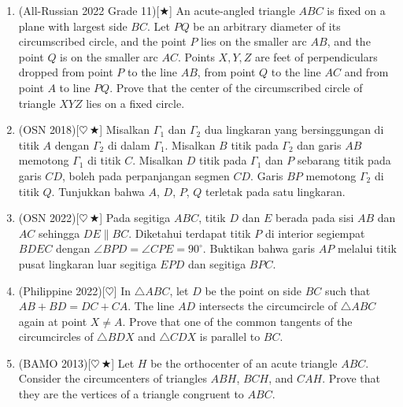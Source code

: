 \documentclass[letterpaper, 13pt]{scrartcl}
\begin{document}
\begin{enumerate}
  \item (All-Russian 2022 Grade 11)[$\bigstar$] An acute-angled triangle $ABC$ is fixed on a plane with largest side $BC$. Let $PQ$ be an arbitrary diameter of its circumscribed circle, and the point $P$ lies on the smaller arc $AB$, and the point $Q$ is on the smaller arc $AC$. Points $X, Y, Z$ are feet of perpendiculars dropped from point $P$ to the line $AB$, from point $Q$ to the line $AC$ and from point $A$ to line $PQ$. Prove that the center of the circumscribed circle of triangle $XYZ$ lies on a fixed circle.

  \item (OSN 2018)[$\heartsuit\,\bigstar$] Misalkan $\Gamma_1$ dan $\Gamma_2$ dua lingkaran yang bersinggungan di titik $A$ dengan $\Gamma_2$ di dalam $\Gamma_1$. Misalkan $B$ titik pada $\Gamma_2$ dan garis $AB$ memotong $\Gamma_1$ di titik $C$. Misalkan $D$ titik pada $\Gamma_1$ dan $P$ sebarang titik pada garis $CD$, boleh pada perpanjangan segmen $CD$. Garis $BP$ memotong $\Gamma_2$ di titik $Q$. Tunjukkan bahwa $A$, $D$, $P$, $Q$ terletak pada satu lingkaran.

  \item (OSN 2022)[$\heartsuit\,\bigstar$] Pada segitiga $ABC$, titik $D$ dan $E$ berada pada sisi $AB$ dan $AC$ sehingga $DE \parallel BC$. Diketahui terdapat titik $P$ di interior segiempat $BDEC$ dengan $\angle BPD = \angle CPE = 90^\circ$. Buktikan bahwa garis $AP$ melalui titik pusat lingkaran luar segitiga $EPD$ dan segitiga $BPC$.


  \item (Philippine 2022)[$\heartsuit$] In $\triangle ABC$, let $D$ be the point on side $BC$ such that $AB + BD = DC + CA$. The line $AD$ intersects the circumcircle of $\triangle ABC$ again at point $X \neq A$. Prove that one of the common tangents of the circumcircles of $\triangle BDX$ and $\triangle CDX$ is parallel to $BC$.

  \item (BAMO 2013)[$\heartsuit\,\bigstar$] Let $H$ be the orthocenter of an acute triangle $ABC$. Consider the circumcenters of triangles $ABH$, $BCH$, and $CAH$. Prove that they are the vertices of a triangle congruent to $ABC$.


\end{enumerate}
\end{document}
